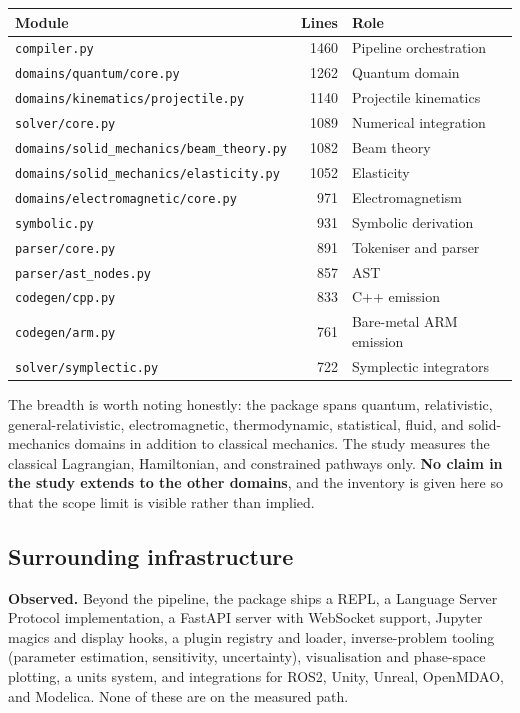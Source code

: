 \documentclass[11pt,a4paper]{article}
\begin{document}
\begin{center}
\begin{tabular}{@{}lrL{0.34\textwidth}@{}}
\toprule
\textbf{Module} & \textbf{Lines} & \textbf{Role} \\
\midrule
\texttt{compiler.py}                 & 1460 & Pipeline orchestration \\
\texttt{domains/quantum/core.py}     & 1262 & Quantum domain \\
\texttt{domains/kinematics/projectile.py} & 1140 & Projectile kinematics \\
\texttt{solver/core.py}              & 1089 & Numerical integration \\
\texttt{domains/solid\_mechanics/beam\_theory.py} & 1082 & Beam theory \\
\texttt{domains/solid\_mechanics/elasticity.py} & 1052 & Elasticity \\
\texttt{domains/electromagnetic/core.py} & 971 & Electromagnetism \\
\texttt{symbolic.py}                 & 931  & Symbolic derivation \\
\texttt{parser/core.py}              & 891  & Tokeniser and parser \\
\texttt{parser/ast\_nodes.py}        & 857  & AST \\
\texttt{codegen/cpp.py}              & 833  & C++ emission \\
\texttt{codegen/arm.py}              & 761  & Bare-metal ARM emission \\
\texttt{solver/symplectic.py}        & 722  & Symplectic integrators \\
\bottomrule
\end{tabular}
\end{center}

\noindent The breadth is worth noting honestly: the package spans quantum,
relativistic, general-relativistic, electromagnetic, thermodynamic, statistical,
fluid, and solid-mechanics domains in addition to classical mechanics. The
study measures the classical Lagrangian, Hamiltonian, and constrained pathways
only. \textbf{No claim in the study extends to the other domains}, and the
inventory is given here so that the scope limit is visible rather than implied.

\subsection{Surrounding infrastructure}

\noindent\textbf{Observed.} Beyond the pipeline, the package ships a REPL, a
Language Server Protocol implementation, a FastAPI server with WebSocket
support, Jupyter magics and display hooks, a plugin registry and loader,
inverse-problem tooling (parameter estimation, sensitivity, uncertainty),
visualisation and phase-space plotting, a units system, and integrations for
ROS2, Unity, Unreal, OpenMDAO, and Modelica. None of these are on the measured
path.
\end{document}
